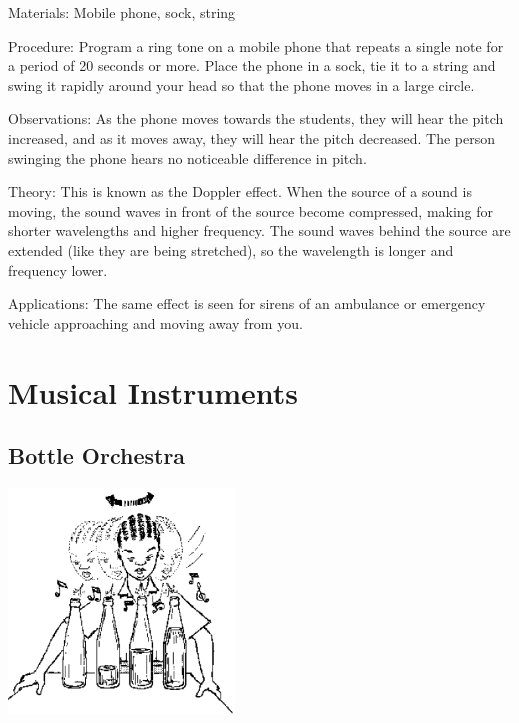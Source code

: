 \begin{multicols}{2}
\begin{description*}
\item[Materials:]{Mobile phone, sock, string}
\item[Procedure:]{Program a ring tone on a mobile phone that repeats a single note for a period of 20 seconds or more. Place the phone in a sock, tie it to a string and swing it rapidly around your head so that the phone moves in a large circle.}
\item[Observations:]{As the phone moves towards the students, they will hear the pitch increased, and as it moves away, they will hear the pitch decreased. The person swinging the phone hears no noticeable difference in pitch.}
\item[Theory:]{This is known as the Doppler effect. When the source of a sound is moving, the sound waves in front of the source become compressed, making for shorter wavelengths and higher frequency. The sound waves behind the source are extended (like they are being stretched), so the wavelength is longer and frequency lower.}
\item[Applications:]{The same effect is seen for sirens of an ambulance or emergency vehicle approaching and moving away from you.}
\end{description*}


\section*{Musical Instruments}


\subsection{Bottle Orchestra}

\begin{center}
\includegraphics[width=0.45\textwidth]{./img/source/bottle-orchestra.png}
\end{center}


\end{multicols}
